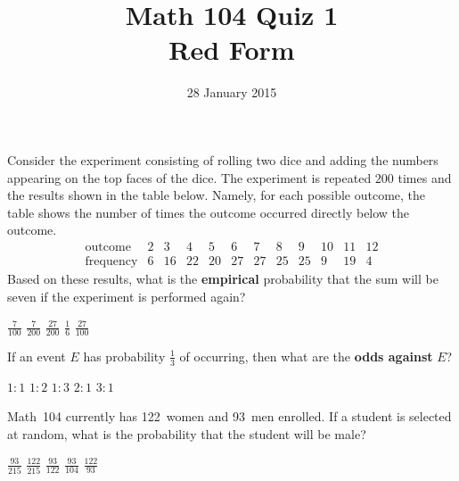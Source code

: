 \documentclass[answers,12pt]{exam}
\title{Math 104 Quiz 1\\Red Form}
\date{28 January 2015}
\begin{document}
\maketitle

\begin{center}
\end{center}

\begin{questions}

\question Consider the experiment consisting
of rolling two dice and adding the numbers
appearing on the top faces of the dice.
The experiment is repeated $200$ times and the
results shown in the table below. Namely, 
for each possible outcome, the table shows the number
of times the outcome occurred directly below the outcome.
\[\begin{array}{r|ccccccccccc}
\text{outcome}&2&3&4&5&6&7&8&9&10&11&12\\\hline
\text{frequency}&6&16&22&20&27&27&25&25&9&19&4
\end{array}\]
Based on these results, what is the {\bf empirical} probability
that the sum will be seven if the experiment is performed again?\\
\begin{oneparchoices}
\choice $\frac{7}{100}$
\choice $\frac{7}{200}$
\correctchoice $\frac{27}{200}$
\choice $\frac{1}{6}$
\choice $\frac{27}{100}$
\end{oneparchoices}

\question If an event $E$ has probability $\frac{1}{3}$
of occurring, then what are the {\bf odds against} $E$?\\
\begin{oneparchoices}
\choice $1:1$
\choice $1:2$ %
\choice $1:3$ %
\correctchoice $2:1$
\choice $3:1$ %
\end{oneparchoices}

\question Math~104 currently has 122~women and 93~men enrolled.
If a student is selected at random, what is the probability
that the student will be male?\\
\begin{oneparchoices}
\correctchoice $\frac{93}{215}$
\choice $\frac{122}{215}$
\choice $\frac{93}{122}$
\choice $\frac{93}{104}$
\choice $\frac{122}{93}$
\end{oneparchoices}


\end{questions}
\end{document}
